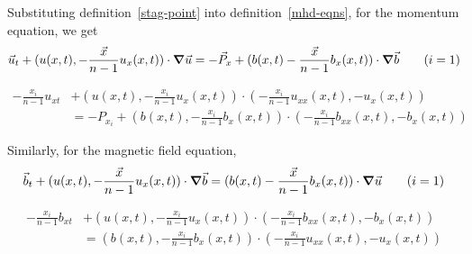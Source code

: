 \documentclass[11pt]{report}
\begin{document}
		\begin{result}
		\label{stag-point-sub}
			Substituting definition~\ref{stag-point} into definition~\ref{mhd-eqns},
			for the momentum equation, we get
			\begin{equation*}
				\vec{u}_t +
					(u(x, t), -\frac{\vec{x}}{n - 1} u_x(x, t)) \cdot \grad \vec{u}
				= -\vec{P}_x +
					(b(x, t) -\frac{\vec{x}}{n - 1} b_x(x, t)) \cdot \grad \vec{b}
				\tag{$i = 1$}
			\end{equation*}

			\begin{equation*}
				\begin{split}
					-\frac{x_i}{n - 1} u_{xt} &+
					(u(x, t), -\frac{x_i}{n - 1} u_x(x, t))
						\cdot (-\frac{x_i}{n - 1} u_{xx}(x, t), -u_x(x, t)) \\
					&= -P_{x_i} + (b(x, t), -\frac{x_i}{n - 1} b_x(x, t))
						\cdot (-\frac{x_i}{n - 1} b_{xx}(x, t), -b_x(x, t))
				\end{split}
				\tag{$i > 1$}
			\end{equation*}

			Similarly, for the magnetic field equation,
			\begin{equation*}
				\vec{b}_t +
					(u(x, t), -\frac{\vec{x}}{n - 1} u_x(x, t)) \cdot \grad \vec{b}
				= (b(x, t) -\frac{\vec{x}}{n - 1} b_x(x, t)) \cdot \grad \vec{u}
				\tag{$i = 1$}
			\end{equation*}
			
			\begin{equation*}
				\begin{split}
					-\frac{x_i}{n - 1} b_{xt} &+
					(u(x, t), -\frac{x_i}{n - 1} u_x(x, t))
						\cdot (-\frac{x_i}{n - 1} b_{xx}(x, t), -b_x(x, t)) \\
					&= (b(x, t), -\frac{x_i}{n - 1} b_x(x, t))
						\cdot (-\frac{x_i}{n - 1} u_{xx}(x, t), -u_x(x, t))
				\end{split}
				\tag{$i > 1$}
			\end{equation*}
		\end{result}
		
\end{document}
